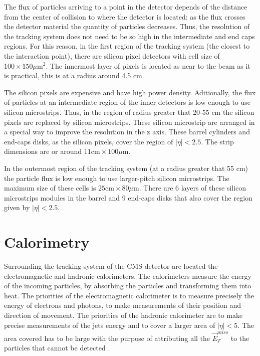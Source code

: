The flux of particles arriving to a point in the detector depends of the distance from the center of collision to where the detector is located: as the flux crosses the detector material the quantity of particles decreases. Thus, the resolution of the tracking system does not need to be so high in the intermediate and end caps regions. For this reason, in the first region of the tracking system (the closest to the interaction point), there are silicon pixel detectors with cell size of $100 \times 150 \mu \text{m}^2$. The innermost layer of pixels is located as near to the beam as it is practical, this is at a radius around 4.5 cm.
 
The silicon pixels are expensive and have high power density. Aditionally, the flux of particles at an intermediate region of the inner detectors is low enough to use silicon microstrips. Thus, in the region of radius greater that 20-55 cm the silicon pixels are replaced by silicon microstrips. These silicon microstrip are arranged in a special way to improve the resolution in the z axis. These barrel cylinders and end-caps disks, as the silicon pixels, cover the region of $|\eta| < 2.5$. The strip dimensions are or around $11 \text{cm} \times 100 \mu \text{m}$.

In the outermost region of the tracking system (at a radius greater that 55 cm) the particle flux is low enough to use larger-pitch silicon microstrips. The maximum size of these cells is $25\text{cm} \times 80 \mu \text{m}$. There are 6 layers of these silicon microstrips modules in the barrel and 9 end-caps disks that also cover the region given by $|\eta|< 2.5$.


\section{Calorimetry}

Surrounding the tracking system of the CMS detector are located the electromagnetic and hadronic calorimeters. The calorimeters measure the energy of the incoming particles, by absorbing the particles and transforming them into heat. The priorities of the electromagnetic calorimeter is to measure precisely the energy of electrons and photons, to make measurements of their position and direction of movement. The priorities of the hadronic calorimeter are to make precise measurements of the jets energy and to cover a larger area of $|\eta| < 5$. The area covered has to be large with the purpose of attributing all the $\vec{E}_T^{miss}$ to the particles that cannot be detected \cite{Perspectives_LHC}. 

